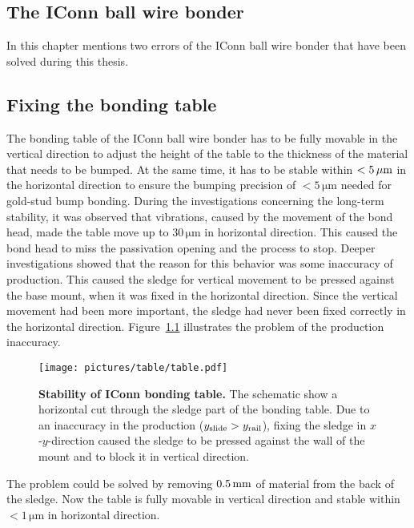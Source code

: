 \acresetall


\begin{appendices}

\chapter{The IConn ball wire bonder}
In this chapter mentions two errors of the IConn ball wire bonder that have been solved during this thesis.

\section{Fixing the bonding table}\label{sec:bonding_table}
The bonding table of the IConn ball wire bonder has to be fully movable in the vertical direction to adjust the height of the table to the thickness of the material that needs to be bumped. At the same time, it has to be stable within $< 5\,\rm{\mu m}$ in the horizontal direction to ensure the bumping precision of $<5\,\si{\micro \meter}$ needed for gold-stud bump bonding. During the investigations concerning the long-term stability, it was observed that vibrations, caused by the movement of the bond head, made the table move up to $30\,\si{\micro \meter}$ in horizontal direction. This caused the bond head to miss the passivation opening and the process to stop. Deeper investigations showed that the reason for this behavior was some inaccuracy of production. This caused the sledge for vertical movement to be pressed against the base mount, when it was fixed in the horizontal direction. Since the vertical movement had been more important, the sledge had never been fixed correctly in the horizontal direction. Figure~\ref{fig:table} illustrates the problem of the production inaccuracy.
\begin{figure}
\begin{center}
\texttt{[image: pictures/table/table.pdf]}
\end{center}
\caption[Stability of IConn bonding table]{\textbf{Stability of IConn bonding table.} The schematic show a horizontal cut through the sledge part of the bonding table. Due to an inaccuracy in the production ($y_{\rm{slide}}>y_{\rm{rail}}$), fixing the sledge in $x$-$y$-direction caused the sledge to be pressed against the wall of the mount and to block it in vertical direction. }\label{fig:table}
\end{figure}
The problem could be solved by removing $0.5\, \rm{mm}$ of material from the back of the sledge. Now the table is fully movable in vertical direction and stable within $< 1\,\si{\micro \meter}$ in horizontal direction.



\end{appendices}
